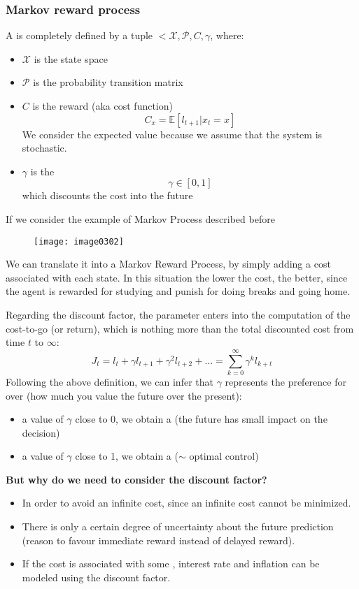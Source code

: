 \subsubsection{Markov reward process}
A  is completely defined by a tuple $<\mathcal{X}, \mathcal{P}, C, \gamma$, where:
\begin{itemize}
\item $\mathcal{X}$ is the state space
\item $\mathcal{P}$ is the probability transition matrix
\item $C$ is the reward (aka cost function)
\[C_x = \mathbb{E}[l_{t+1}|x_t = x]\]
We consider the expected value because we assume that the system is stochastic.
\item $\gamma$ is the 
\[\gamma \in [0,1]\]
which discounts the cost into the future
\end{itemize}
If we consider the example of Markov Process described before

\begin{figure}[!h]
\centering
\texttt{[image: image0302]}
\end{figure}
We can translate it into a Markov Reward Process, by simply adding a cost associated with each state. In this situation the lower the cost, the better, since the agent is rewarded for studying and punish for doing breaks and going home.

Regarding the discount factor, the parameter enters into the computation of the cost-to-go (or return), which is nothing more than the total discounted cost from time $t$ to $\infty$:
\[J_t = l_t + \gamma l_{t+1} + \gamma^2 l_{t+2} + ... = \sum_{k=0}^{\infty} \gamma^{k}l_{k+t}\]
Following the above definition, we can infer that $\gamma$ represents the preference for  over  (how much you value the future over the present):
\begin{itemize}
\item a value of $\gamma$ close to 0, we obtain a  (the future has small impact on the decision)
\item a value of $\gamma$ close to 1, we obtain a  ($\sim$ optimal control)
\end{itemize}

\begin{center}
\textbf{But why do we need to consider the discount factor?}
\end{center}
\begin{itemize}
\item In order to avoid an infinite cost, since an infinite cost cannot be minimized.
\item There is only a certain degree of uncertainty about the future prediction (reason to favour immediate reward instead of delayed reward).
\item If the cost is associated with some , interest rate and inflation can be modeled using the discount factor. 
\end{itemize}

